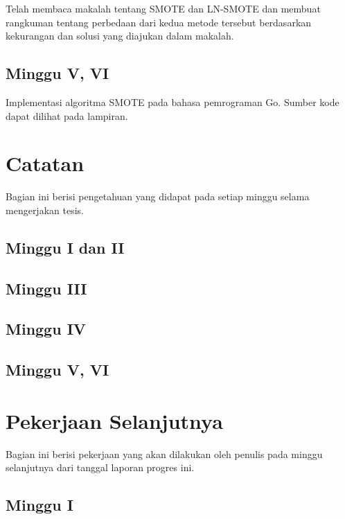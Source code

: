 Telah membaca makalah tentang SMOTE \cite{chawla2002smote} dan LN-SMOTE \cite{maciejewski2011local} dan membuat rangkuman tentang perbedaan dari kedua metode tersebut berdasarkan kekurangan dan solusi yang diajukan dalam makalah.

\subsection{Minggu V, VI}

Implementasi algoritma SMOTE pada bahasa pemrograman Go. Sumber kode dapat dilihat pada lampiran.


\newpage
\section{Catatan} \label{sec:catatan}

Bagian ini berisi pengetahuan yang didapat pada setiap minggu selama mengerjakan tesis.

\subsection{Minggu I dan II}


\subsection{Minggu III}


\subsection{Minggu IV}


\subsection{Minggu V, VI}



\newpage
\section{Pekerjaan Selanjutnya}

Bagian ini berisi pekerjaan yang akan dilakukan oleh penulis pada minggu selanjutnya dari tanggal laporan progres ini.

\subsection{Minggu I}

